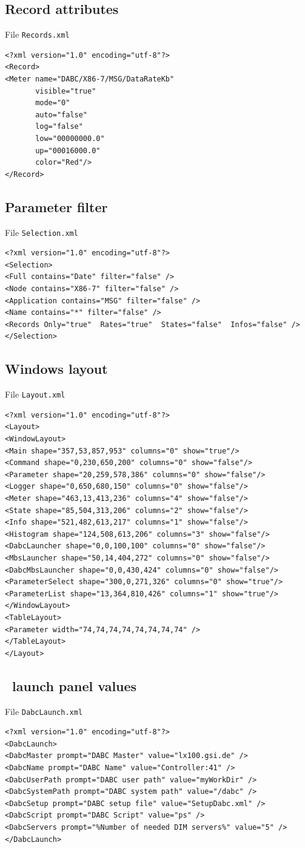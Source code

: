 \subsection{Record attributes}
File {\tt Records.xml}
{\small \begin{verbatim}
<?xml version="1.0" encoding="utf-8"?>
<Record>
<Meter name="DABC/X86-7/MSG/DataRateKb" 
       visible="true" 
       mode="0" 
       auto="false" 
       log="false" 
       low="00000000.0" 
       up="00016000.0" 
       color="Red"/>
</Record>
\end{verbatim}
}
\subsection{Parameter filter}
File {\tt Selection.xml}
{\small \begin{verbatim}
<?xml version="1.0" encoding="utf-8"?>
<Selection>
<Full contains="Date" filter="false" />
<Node contains="X86-7" filter="false" />
<Application contains="MSG" filter="false" />
<Name contains="*" filter="false" />
<Records Only="true"  Rates="true"  States="false"  Infos="false" />
</Selection>
\end{verbatim}
}
\subsection{Windows layout}
File {\tt Layout.xml}
{\small \begin{verbatim}
<?xml version="1.0" encoding="utf-8"?>
<Layout>
<WindowLayout>
<Main shape="357,53,857,953" columns="0" show="true"/>
<Command shape="0,230,650,200" columns="0" show="false"/>
<Parameter shape="20,259,578,386" columns="0" show="false"/>
<Logger shape="0,650,680,150" columns="0" show="false"/>
<Meter shape="463,13,413,236" columns="4" show="false"/>
<State shape="85,504,313,206" columns="2" show="false"/>
<Info shape="521,482,613,217" columns="1" show="false"/>
<Histogram shape="124,508,613,206" columns="3" show="false"/>
<DabcLauncher shape="0,0,100,100" columns="0" show="false"/>
<MbsLauncher shape="50,14,404,272" columns="0" show="false"/>
<DabcMbsLauncher shape="0,0,430,424" columns="0" show="false"/>
<ParameterSelect shape="300,0,271,326" columns="0" show="true"/>
<ParameterList shape="13,364,810,426" columns="1" show="true"/>
</WindowLayout>
<TableLayout>
<Parameter width="74,74,74,74,74,74,74,74" />
</TableLayout>
</Layout>
\end{verbatim}
}
\subsection{\dabc\ launch panel values}
File {\tt DabcLaunch.xml}
{\small \begin{verbatim}
<?xml version="1.0" encoding="utf-8"?>
<DabcLaunch>
<DabcMaster prompt="DABC Master" value="lx100.gsi.de" />
<DabcName prompt="DABC Name" value="Controller:41" />
<DabcUserPath prompt="DABC user path" value="myWorkDir" />
<DabcSystemPath prompt="DABC system path" value="/dabc" />
<DabcSetup prompt="DABC setup file" value="SetupDabc.xml" />
<DabcScript prompt="DABC Script" value="ps" />
<DabcServers prompt="%Number of needed DIM servers%" value="5" />
</DabcLaunch>
\end{verbatim}
}
